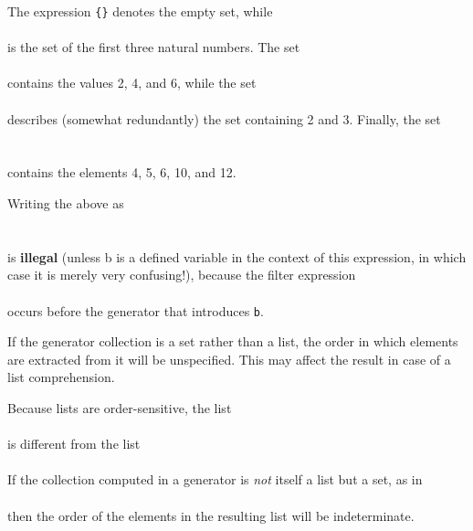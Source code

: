 \begin{example}
The expression {\tt \{\}} denotes the empty set, while \\
\\
is the set of the first three natural numbers. The set \\
\\
contains the values 2, 4, and 6, while the set \\
 \\
describes (somewhat redundantly) the set containing 2 and 3. Finally,
the set \\
\\
\exindent{} \\
contains the elements 4, 5, 6, 10, and 12.

Writing the above as \\
\\
\exindent{} \\
is {\bf illegal} (unless b is a defined variable in the context of this
expression, in which case it is merely very confusing!), because the
filter expression \\
 \\
occurs before the generator that introduces {\tt b}.
\end{example}


If the generator collection is a set rather than a list, the order in
which elements are extracted
from it will be unspecified. This may affect the result in case of a
list comprehension.

\begin{example}
Because lists are order-sensitive, the list \\
\exindent{\tt [ a : for a in [1, 2, 3] ]} \\
is different from the list\\ 
\exindent{\tt [ a : for a in [3, 2, 1] ]} \\
If the collection computed in a generator is {\em not} itself a list
but a set, as in \\
\exindent{\tt [ a : for a in \{1, 2, 3\} ]} \\
then the order of the elements in the resulting list will be
indeterminate.
\end{example}

